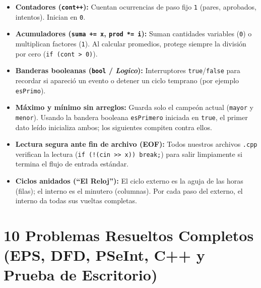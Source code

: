 \documentclass[11pt,letterpaper]{article}
\begin{document}
\begin{itemize}
  \item \textbf{Contadores (\texttt{cont++}):} Cuentan ocurrencias de paso fijo \texttt{1} (pares, aprobados, intentos). Inician en \texttt{0}.
  \item \textbf{Acumuladores (\texttt{suma += x}, \texttt{prod *= i}):} Suman cantidades variables (\texttt{0}) o multiplican factores (\texttt{1}). Al calcular promedios, protege siempre la división por cero (\texttt{if (cont > 0)}).
  \item \textbf{Banderas booleanas (\texttt{bool} / \textit{Logico}):} Interruptores \texttt{true}/\texttt{false} para recordar si apareció un evento o detener un ciclo temprano (por ejemplo \texttt{esPrimo}).
  \item \textbf{Máximo y mínimo sin arreglos:} Guarda solo el campeón actual (\texttt{mayor} y \texttt{menor}). Usando la bandera booleana \texttt{esPrimero} iniciada en \texttt{true}, el primer dato leído inicializa ambos; los siguientes compiten contra ellos.
  \item \textbf{Lectura segura ante fin de archivo (EOF):} Todos nuestros archivos \texttt{.cpp} verifican la lectura (\texttt{if (!(cin >> x)) break;}) para salir limpiamente si termina el flujo de entrada estándar.
  \item \textbf{Ciclos anidados (``El Reloj''):} El ciclo externo es la aguja de las horas (filas); el interno es el minutero (columnas). Por cada paso del externo, el interno da todas sus vueltas completas.
\end{itemize}



\section{10 Problemas Resueltos Completos (EPS, DFD, PSeInt, C++ y Prueba de Escritorio)}

\end{document}
